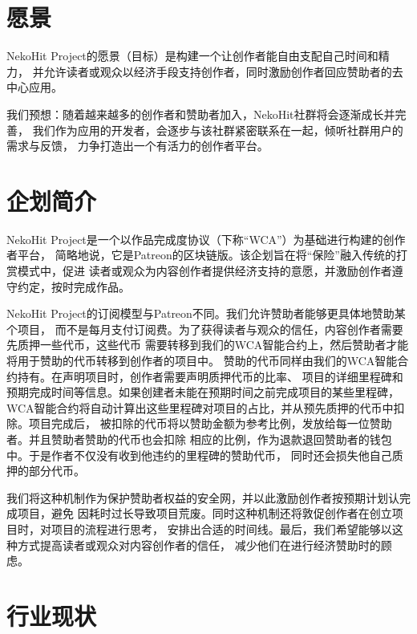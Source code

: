 \documentclass[11pt,UTF8,a4paper]{ctexart}
\begin{document}


    \section{愿景}\label{sec:goal}

    NekoHit Project的愿景（目标）是构建一个让创作者能自由支配自己时间和精力，
    并允许读者或观众以经济手段支持创作者，同时激励创作者回应赞助者的去中心应用。

    我们预想：随着越来越多的创作者和赞助者加入，NekoHit社群将会逐渐成长并完善，
    我们作为应用的开发者，会逐步与该社群紧密联系在一起，倾听社群用户的需求与反馈，
    力争打造出一个有活力的创作者平台。


    \section{企划简介}\label{sec:intro}

    NekoHit Project是一个以作品完成度协议（下称“WCA”）为基础进行构建的创作者平台，
    简略地说，它是Patreon的区块链版。该企划旨在将“保险”融入传统的打赏模式中，促进
    读者或观众为内容创作者提供经济支持的意愿，并激励创作者遵守约定，按时完成作品。

    NekoHit Project的订阅模型与Patreon不同。我们允许赞助者能够更具体地赞助某个项目，
    而不是每月支付订阅费。为了获得读者与观众的信任，内容创作者需要先质押一些代币，这些代币
    需要转移到我们的WCA智能合约上，然后赞助者才能将用于赞助的代币转移到创作者的项目中。
    赞助的代币同样由我们的WCA智能合约持有。在声明项目时，创作者需要声明质押代币的比率、
    项目的详细里程碑和预期完成时间等信息。如果创建者未能在预期时间之前完成项目的某些里程碑，
    WCA智能合约将自动计算出这些里程碑对项目的占比，并从预先质押的代币中扣除。项目完成后，
    被扣除的代币将以赞助金额为参考比例，发放给每一位赞助者。并且赞助者赞助的代币也会扣除
    相应的比例，作为退款退回赞助者的钱包中。于是作者不仅没有收到他违约的里程碑的赞助代币，
    同时还会损失他自己质押的部分代币。

    我们将这种机制作为保护赞助者权益的安全网，并以此激励创作者按预期计划认完成项目，避免
    因耗时过长导致项目荒废。同时这种机制还将敦促创作者在创立项目时，对项目的流程进行思考，
    安排出合适的时间线。最后，我们希望能够以这种方式提高读者或观众对内容创作者的信任，
    减少他们在进行经济赞助时的顾虑。


    \section{行业现状}\label{sec:now}
\end{document}
